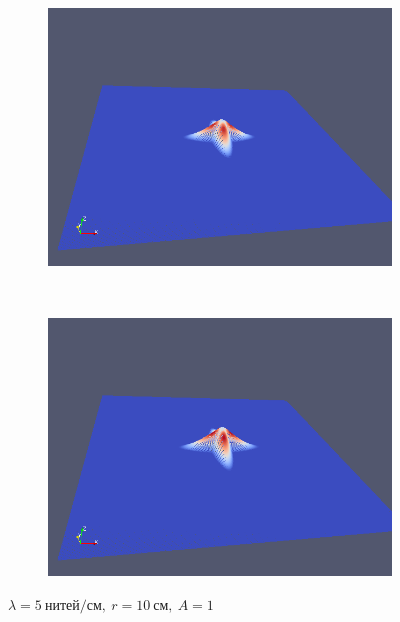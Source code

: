 \begin{figure}[H]
\begin{subfigure}[t]{0.5\textwidth}
        \includegraphics[width=\textwidth]{img/fiber/density_5_radius_10_amplitude_1/5.png}
    \end{subfigure}%
    ~
    \begin{subfigure}[t]{0.5\textwidth}
        \centering
        \includegraphics[width=\textwidth]{img/fiber/density_5_radius_10_amplitude_1/6.png}
    \end{subfigure}
    \caption{$\lambda=5~нитей/см,~r=10~см,~A=1$}
\end{figure}
